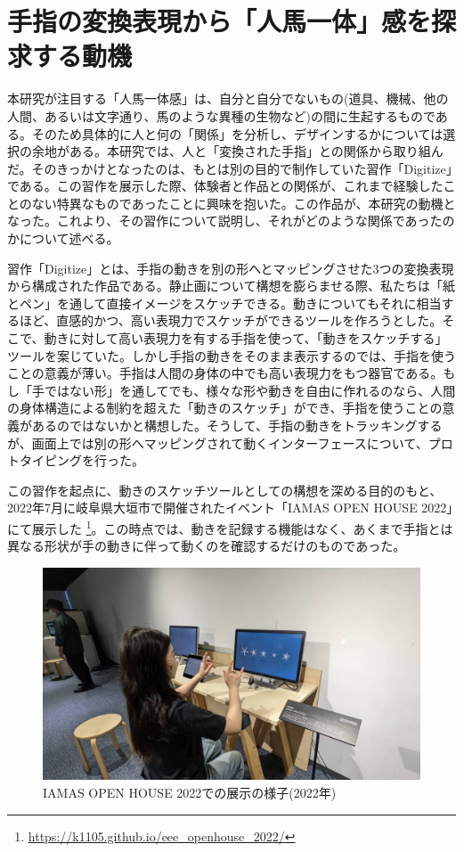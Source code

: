 \section{手指の変換表現から「人馬一体」感を探求する動機}
\label{prototyping_concept_making}
本研究が注目する「人馬一体感」は、自分と自分でないもの(道具、機械、他の人間、あるいは文字通り、馬のような異種の生物など)の間に生起するものである。そのため具体的に人と何の「関係」を分析し、デザインするかについては選択の余地がある。本研究では、人と「変換された手指」との関係から取り組んだ。そのきっかけとなったのは、もとは別の目的で制作していた習作「Digitize」である。この習作を展示した際、体験者と作品との関係が、これまで経験したことのない特異なものであったことに興味を抱いた。この作品が、本研究の動機となった。これより、その習作について説明し、それがどのような関係であったのかについて述べる。

習作「Digitize」とは、手指の動きを別の形へとマッピングさせた3つの変換表現から構成された作品である。静止画について構想を膨らませる際、私たちは「紙とペン」を通して直接イメージをスケッチできる。動きについてもそれに相当するほど、直感的かつ、高い表現力でスケッチができるツールを作ろうとした。そこで、動きに対して高い表現力を有する手指を使って、「動きをスケッチする」ツールを案じていた。しかし手指の動きをそのまま表示するのでは、手指を使うことの意義が薄い。手指は人間の身体の中でも高い表現力をもつ器官である。もし「手ではない形」を通してでも、様々な形や動きを自由に作れるのなら、人間の身体構造による制約を超えた「動きのスケッチ」ができ、手指を使うことの意義があるのではないかと構想した。そうして、手指の動きをトラッキングするが、画面上では別の形へマッピングされて動くインターフェースについて、プロトタイピングを行った。

この習作を起点に、動きのスケッチツールとしての構想を深める目的のもと、2022年7月に岐阜県大垣市で開催されたイベント「IAMAS OPEN HOUSE 2022」にて展示した \footnote{\url{https://k1105.github.io/eee_openhouse_2022/}}。この時点では、動きを記録する機能はなく、あくまで手指とは異なる形状が手の動きに伴って動くのを確認するだけのものであった。

\begin{figure}[H]
  \centering
  \includegraphics[width=15cm]{img/openhouse2022.jpeg}
  \caption{IAMAS OPEN HOUSE 2022での展示の様子(2022年)}
  \label{fig:exhibit_2022}
\end{figure}

